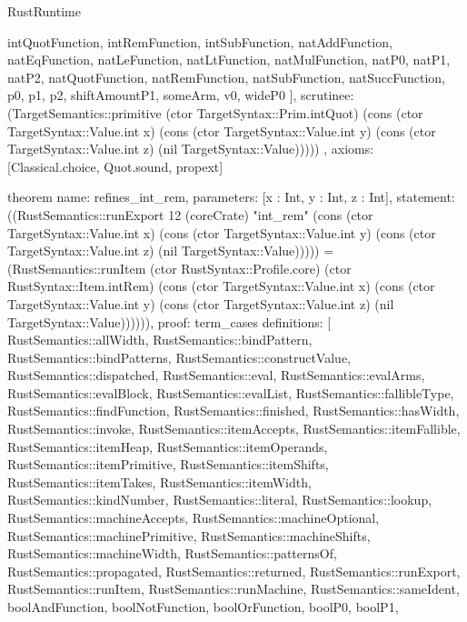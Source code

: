 \begin{lexlean}{RustRuntime}
\begin{semanticmodule}
{{      intQuotFunction,
      intRemFunction,
      intSubFunction,
      natAddFunction,
      natEqFunction,
      natLeFunction,
      natLtFunction,
      natMulFunction,
      natP0,
      natP1,
      natP2,
      natQuotFunction,
      natRemFunction,
      natSubFunction,
      natSuccFunction,
      p0,
      p1,
      p2,
      shiftAmountP1,
      someArm,
      v0,
      wideP0
    ],
    scrutinee: (TargetSemantics::primitive (ctor TargetSyntax::Prim.intQuot) (cons (ctor TargetSyntax::Value.int x) (cons (ctor TargetSyntax::Value.int y) (cons (ctor TargetSyntax::Value.int z) (nil TargetSyntax::Value)))))
  },
  axioms: [Classical.choice, Quot.sound, propext]
}

theorem{
  name: refines_int_rem,
  parameters: [x : Int, y : Int, z : Int],
  statement: ((RustSemantics::runExport 12 (coreCrate) "int_rem" (cons (ctor TargetSyntax::Value.int x) (cons (ctor TargetSyntax::Value.int y) (cons (ctor TargetSyntax::Value.int z) (nil TargetSyntax::Value))))) = (RustSemantics::runItem (ctor RustSyntax::Profile.core) (ctor RustSyntax::Item.intRem) (cons (ctor TargetSyntax::Value.int x) (cons (ctor TargetSyntax::Value.int y) (cons (ctor TargetSyntax::Value.int z) (nil TargetSyntax::Value)))))),
  proof: term_cases{
    definitions: [
      RustSemantics::allWidth,
      RustSemantics::bindPattern,
      RustSemantics::bindPatterns,
      RustSemantics::constructValue,
      RustSemantics::dispatched,
      RustSemantics::eval,
      RustSemantics::evalArms,
      RustSemantics::evalBlock,
      RustSemantics::evalList,
      RustSemantics::fallibleType,
      RustSemantics::findFunction,
      RustSemantics::finished,
      RustSemantics::hasWidth,
      RustSemantics::invoke,
      RustSemantics::itemAccepts,
      RustSemantics::itemFallible,
      RustSemantics::itemHeap,
      RustSemantics::itemOperands,
      RustSemantics::itemPrimitive,
      RustSemantics::itemShifts,
      RustSemantics::itemTakes,
      RustSemantics::itemWidth,
      RustSemantics::kindNumber,
      RustSemantics::literal,
      RustSemantics::lookup,
      RustSemantics::machineAccepts,
      RustSemantics::machineOptional,
      RustSemantics::machinePrimitive,
      RustSemantics::machineShifts,
      RustSemantics::machineWidth,
      RustSemantics::patternsOf,
      RustSemantics::propagated,
      RustSemantics::returned,
      RustSemantics::runExport,
      RustSemantics::runItem,
      RustSemantics::runMachine,
      RustSemantics::sameIdent,
      boolAndFunction,
      boolNotFunction,
      boolOrFunction,
      boolP0,
      boolP1,
}}
\end{semanticmodule}
\end{lexlean}
